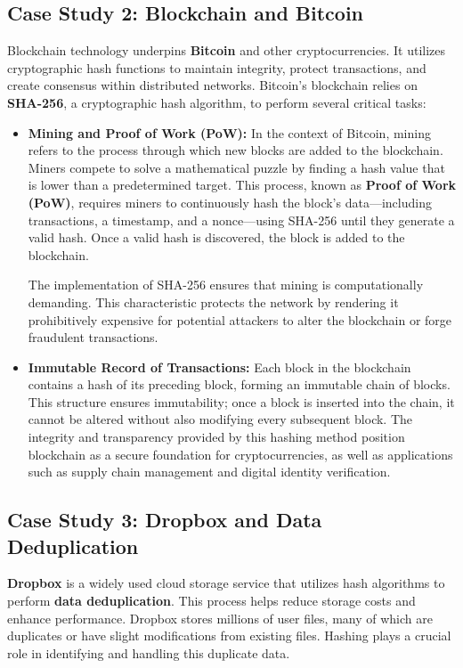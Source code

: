\documentclass[11pt,a4paper]{article}
\begin{document}
    \subsection*{Case Study 2: Blockchain and Bitcoin}
    Blockchain technology underpins \textbf{Bitcoin} and other cryptocurrencies. It utilizes cryptographic hash functions to maintain integrity, protect transactions, and create consensus within distributed networks. Bitcoin's blockchain relies on \textbf{SHA-256}, a cryptographic hash algorithm, to perform several critical tasks:
        \begin{itemize}
            \item \textbf{Mining and Proof of Work (PoW):}
            \newline
            In the context of Bitcoin, mining refers to the process through which new blocks are added to the blockchain. Miners compete to solve a mathematical puzzle by finding a hash value that is lower than a predetermined target. This process, known as \textbf{Proof of Work (PoW)}, requires miners to continuously hash the block's data—including transactions, a timestamp, and a nonce—using SHA-256 until they generate a valid hash. Once a valid hash is discovered, the block is added to the blockchain.
            \par
            The implementation of SHA-256 ensures that mining is computationally demanding. This characteristic protects the network by rendering it prohibitively expensive for potential attackers to alter the blockchain or forge fraudulent transactions.


            \item \textbf{Immutable Record of Transactions:}
            \newline
            Each block in the blockchain contains a hash of its preceding block, forming an immutable chain of blocks. This structure ensures immutability; once a block is inserted into the chain, it cannot be altered without also modifying every subsequent block. The integrity and transparency provided by this hashing method position blockchain as a secure foundation for cryptocurrencies, as well as applications such as supply chain management and digital identity verification.

        \end{itemize}

    \subsection*{Case Study 3: Dropbox and Data Deduplication}
    \textbf{Dropbox} is a widely used cloud storage service that utilizes hash algorithms to perform \textbf{data deduplication}. This process helps reduce storage costs and enhance performance. Dropbox stores millions of user files, many of which are duplicates or have slight modifications from existing files. Hashing plays a crucial role in identifying and handling this duplicate data.
\end{document}
